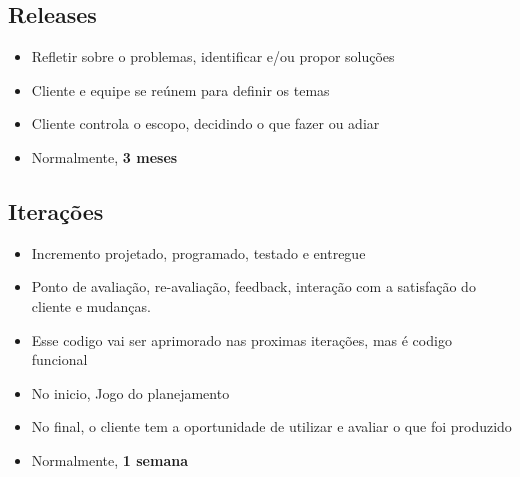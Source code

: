 \documentclass[10pt]{beamer}
\begin{document}
\subsection{Releases}

\begin{frame}
  \begin{figure}
    \centering
  \end{figure}
  \begin{itemize}%
    \item Refletir sobre o problemas, identificar e/ou propor soluções
    \item Cliente e equipe se reúnem para definir os temas
    \item Cliente controla o escopo, decidindo o que fazer ou adiar
    \item Normalmente, \textbf{3 meses}
  \end{itemize}
\end{frame}

\subsection{Iterações}

\begin{frame}
  \begin{itemize}%
    \item Incremento projetado, programado, testado e entregue
    \item Ponto de avaliação, re-avaliação, feedback, interação com a satisfação do cliente e mudanças.
    \item Esse codigo vai ser aprimorado nas proximas iterações, mas é codigo funcional
    \item No inicio, Jogo do planejamento
    \item No final, o cliente tem a oportunidade de utilizar e avaliar o que foi produzido
    \item Normalmente, \textbf{1 semana}
  \end{itemize}
\end{frame}

\begin{frame}
  \begin{figure}
    \centering
  \end{figure}
\end{frame}
\end{document}
